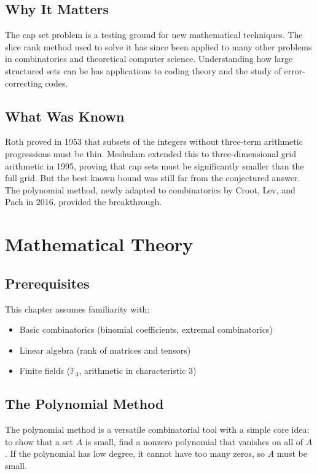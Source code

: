 \subsection{Why It Matters}
The cap set problem is a testing ground for new mathematical techniques. The slice rank method used to solve it has since been applied to many other problems in combinatorics and theoretical computer science. Understanding how large structured sets can be has applications to coding theory and the study of error-correcting codes.

\subsection{What Was Known}
Roth proved in 1953 that subsets of the integers without three-term arithmetic progressions must be thin. Meshulam extended this to three-dimensional grid arithmetic in 1995, proving that cap sets must be significantly smaller than the full grid. But the best known bound was still far from the conjectured answer. The polynomial method, newly adapted to combinatorics by Croot, Lev, and Pach in 2016, provided the breakthrough.

\section{Mathematical Theory}

\subsection{Prerequisites}
This chapter assumes familiarity with:
\begin{itemize}
\item Basic combinatorics (binomial coefficients, extremal combinatorics)
\item Linear algebra (rank of matrices and tensors)
\item Finite fields ($\mathbb{F}_3$, arithmetic in characteristic 3)
\end{itemize}

\subsection{The Polynomial Method}

The polynomial method is a versatile combinatorial tool with a simple core idea: to show that a set $A$ is small, find a nonzero polynomial that vanishes on all of $A$. If the polynomial has low degree, it cannot have too many zeros, so $A$ must be small.

